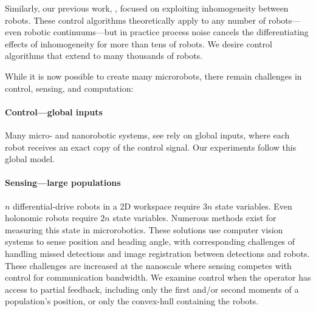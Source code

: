 Similarly, our previous work, \cite{Becker2012,Becker2012k}, focused on exploiting inhomogeneity between robots.  These control algorithms theoretically apply to any number of robots---even robotic continuums---but in practice process noise cancels the differentiating effects of inhomogeneity for more than tens of robots.  We desire control algorithms that extend to many thousands of robots.

 While it is now possible to create many microrobots, there remain challenges in control, sensing, and computation:
  
 \paragraph{Control---global inputs}
 Many micro- and nanorobotic systems, see \cite{Tottori2012,Shirai2005,Chiang2011,Donald2006,Donald2008,Takahashi2006,Floyd2011,Diller2013,Frutiger2008,Peyer2013}
   rely on global inputs, where each robot receives an exact copy of the control signal.  Our experiments follow this global model.
  
 \paragraph{Sensing---large populations}
$n$ differential-drive robots in a 2D workspace require $3n$ state variables. Even holonomic robots require $2n$ state variables. Numerous methods exist for measuring this state in microrobotics.  These solutions use computer vision systems to sense position and heading angle, with corresponding challenges of handling missed detections and image registration between detections and robots.  These challenges are increased at the nanoscale where sensing competes with control for communication bandwidth.   We examine control when the operator has access to partial feedback, including only the first and/or second moments of a population's position, or only the convex-hull containing the robots.
 
